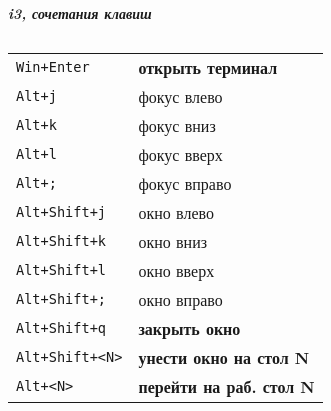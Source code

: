 




\raggedright
\footnotesize

\begin{center}
	\Large{\textbf{\textit{i3, сочетания клавиш}}} \\
\end{center}
\vspace*{0.5cm}

\begin{multicols}{3}


	\setlength{\premulticols}{1pt}
	\setlength{\postmulticols}{1pt}
	\setlength{\multicolsep}{1pt}
	\setlength{\columnsep}{2pt}

	\section{}
	\begin{tabular}{@{}ll@{}}
		\verb!Win+Enter!     & \textbf{открыть терминал}       \\
		\verb!Alt+j!         & фокус влево                     \\
		\verb!Alt+k!         & фокус вниз                      \\
		\verb!Alt+l!         & фокус вверх                     \\
		\verb!Alt+;!         & фокус вправо                    \\
		\verb!Alt+Shift+j!   & окно влево                      \\
		\verb!Alt+Shift+k!   & окно вниз                       \\
		\verb!Alt+Shift+l!   & окно вверх                      \\
		\verb!Alt+Shift+;!   & окно вправо                     \\
		\verb!Alt+Shift+q!   & \textbf{закрыть окно}           \\
		\verb!Alt+Shift+<N>! & \textbf{унести окно на стол N}  \\
		\verb!Alt+<N>!       & \textbf{перейти на раб. стол N} \\
	\end{tabular}


\end{multicols}
